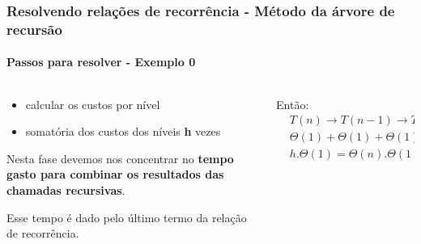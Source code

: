 \begin{frame}
	\frametitle{Resolvendo relações de recorrência - Método da árvore de recursão}
	\framesubtitle{Passos para resolver - Exemplo 0}
	\begin{columns}
		\begin{column}{0.35\textwidth}
			\begin{itemize}
				\item calcular os custos por nível
				\item somatória dos custos dos níveis \textbf{h} vezes
			\end{itemize}
			\par Nesta fase devemos nos concentrar no \textbf{tempo gasto para combinar os resultados das chamadas recursivas}.\newline
			\par Esse tempo é dado pelo último termo da relação de recorrência.
		\end{column}
		\begin{column}{0.65\textwidth}
			\par Então:
			\begin{equation}
				\begin{aligned}
					&T(n) \to T(n-1) \to T(n-2) \to \dots \to T(n-h) \implies \\
					&\Theta(1) + \Theta(1) + \Theta(1) + \dots + \Theta(1)=\mathbf{\Theta(1)} \implies\\
					&h.\Theta(1) = \Theta(n).\Theta(1) = \mathbf{\Theta(n)}
				\end{aligned}
			\end{equation}
		\end{column}
	\end{columns}
\end{frame}


